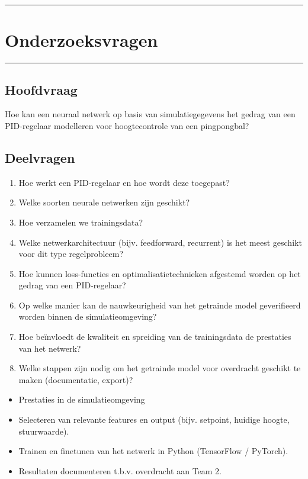 \clearpage
\vspace{0.3cm}
{\color{gray}\hrule}
\section{Onderzoeksvragen}
\vspace{0.3cm}
{\color{gray}\hrule}

\begin{multicols}{2}
\subsection{Hoofdvraag}
Hoe kan een neuraal netwerk op basis van simulatiegegevens het gedrag van een PID-regelaar modelleren voor hoogtecontrole van een pingpongbal?
\subsection{Deelvragen}
\begin{enumerate}
    \item Hoe werkt een PID-regelaar en hoe wordt deze toegepast?
    \item Welke soorten neurale netwerken zijn geschikt?
    \item Hoe verzamelen we trainingsdata?
    \item Welke netwerkarchitectuur (bijv. feedforward, recurrent) is het meest geschikt voor dit type regelprobleem?
    \item Hoe kunnen loss-functies en optimalisatietechnieken afgestemd worden op het gedrag van een PID-regelaar?
    \item Op welke manier kan de nauwkeurigheid van het getrainde model geverifieerd worden binnen de simulatieomgeving?
    \item Hoe beïnvloedt de kwaliteit en spreiding van de trainingsdata de prestaties van het netwerk?
    \item Welke stappen zijn nodig om het getrainde model voor overdracht geschikt te maken (documentatie, export)?
\end{enumerate}

\begin{itemize}
    \item Prestaties in de simulatieomgeving
    \item Selecteren van relevante features en output (bijv. setpoint, huidige hoogte, stuurwaarde).
    \item Trainen en finetunen van het netwerk in Python (TensorFlow / PyTorch).
    \item Resultaten documenteren t.b.v. overdracht aan Team 2.
\end{itemize}
\end{multicols}

